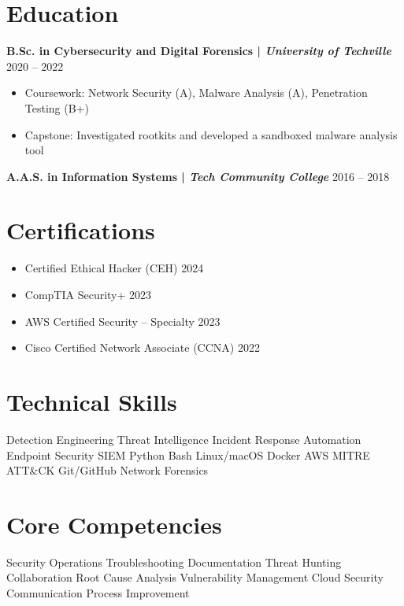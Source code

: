 \documentclass[a4paper,10pt]{article}
\begin{document}
\section{Education}
\textbf{B.Sc. in Cybersecurity and Digital Forensics | \textit{University of Techville}} \hfill 2020 – 2022
\begin{itemize}
    \item Coursework: Network Security (A), Malware Analysis (A), Penetration Testing (B+)
    \item Capstone: Investigated rootkits and developed a sandboxed malware analysis tool
\end{itemize}

\vspace{0.5em}
\textbf{A.A.S. in Information Systems | \textit{Tech Community College}} \hfill 2016 – 2018

\vspace{1mm}

\section{Certifications}
\begin{itemize}
    \item Certified Ethical Hacker (CEH) \hfill 2024
    \item CompTIA Security+ \hfill 2023
    \item AWS Certified Security – Specialty \hfill 2023
    \item Cisco Certified Network Associate (CCNA) \hfill 2022
\end{itemize}

\vspace{3mm}

\section{Technical Skills}
Detection Engineering \textbullet{} Threat Intelligence \textbullet{} Incident Response \textbullet{} Automation \textbullet{} Endpoint Security \textbullet{} SIEM \textbullet{} Python \textbullet{} Bash \textbullet{} Linux/macOS \textbullet{} Docker \textbullet{} AWS \textbullet{} MITRE ATT\&CK \textbullet{} Git/GitHub \textbullet{} Network Forensics

\section{Core Competencies}
Security Operations \textbullet{} Troubleshooting \textbullet{} Documentation \textbullet{} Threat Hunting \textbullet{} Collaboration \textbullet{} Root Cause Analysis \textbullet{} Vulnerability Management \textbullet{} Cloud Security \textbullet{} Communication \textbullet{} Process Improvement
\end{document}
